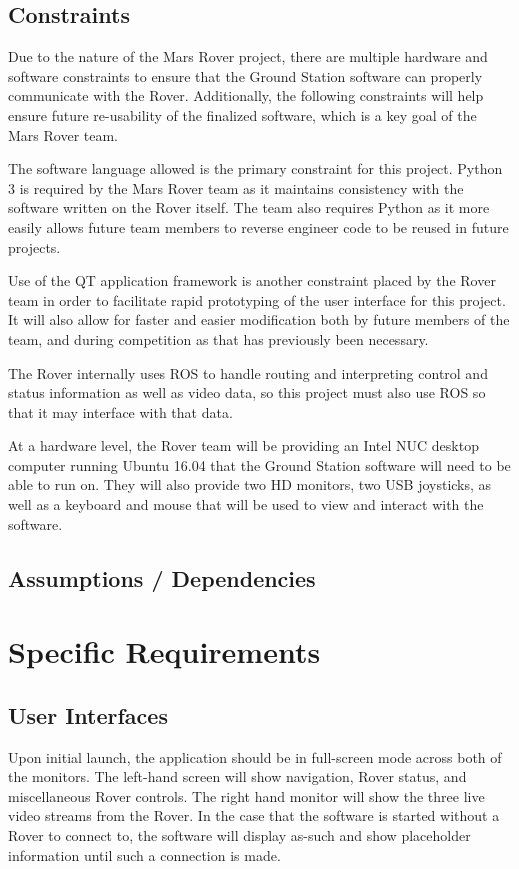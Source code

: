 \documentclass[onecolumn, draftclsnofoot, 10pt, compsoc]{IEEEtran}
\begin{document}
\subsection{Constraints}
Due to the nature of the Mars Rover project, there are multiple hardware and software constraints to ensure that the Ground Station software can properly communicate with the Rover. 
Additionally, the following constraints will help ensure future re-usability of the finalized software, which is a key goal of the Mars Rover team. 
\par
The software language allowed is the primary constraint for this project. 
Python 3 is required by the Mars Rover team as it maintains consistency with the software written on the Rover itself. 
The team also requires Python as it more easily allows future team members to reverse engineer code to be reused in future projects.
\par
Use of the QT application framework is another constraint placed by the Rover team in order to facilitate rapid prototyping of the user interface for this project. 
It will also allow for faster and easier modification both by future members of the team, and during competition as that has previously been necessary.
\par
The Rover internally uses ROS to handle routing and interpreting control and status information as well as video data, so this project must also use ROS so that it may interface with that data.
\par
At a hardware level, the Rover team will be providing an Intel NUC desktop computer running Ubuntu 16.04 that the Ground Station software will need to be able to run on.
They will also provide two HD monitors, two USB joysticks, as well as a keyboard and mouse that will be used to view and interact with the software.
\subsection{Assumptions / Dependencies}
\section{Specific Requirements}
\subsection{User Interfaces}
Upon initial launch, the application should be in full-screen mode across both of the monitors. 
The left-hand screen will show navigation, Rover status, and miscellaneous Rover controls. 
The right hand monitor will show the three live video streams from the Rover. 
In the case that the software is started without a Rover to connect to, the software will display as-such and show placeholder information until such a connection is made.
\end{document}
